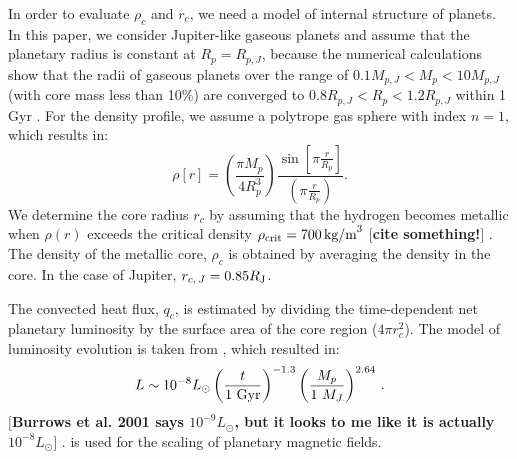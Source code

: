 \documentclass{emulateapj}
\def\memoYF#1{\color{red}$[${\bf #1}$]$ \color{black}}
\begin{document}
In order to evaluate $\rho _c $ and $r_c$, we need a model of internal structure of planets. 
In this paper, we consider Jupiter-like gaseous planets and assume that the planetary radius is constant at $R_p = R_{p,J}$, because the numerical calculations show that the radii of gaseous planets over the range of $0.1 M_{p, J} < M_p < 10M_{p, J}$ (with core mass less than 10\%) are converged to $0.8 R_{p, J} < R_p < 1.2R_{p, J}$ within 1 Gyr \citep{fortney2007}. 
For the density profile, we assume a polytrope gas sphere with index $n=1$, which results in:
\begin{equation}
\rho [r] = \left( \frac{\pi M_p}{4 R_p^3} \right) \frac{\sin \left[ \pi \frac{r}{R_p} \right]}{\left( \pi \frac{r}{R_p} \right)}. \label{eq:rho_r}
\end{equation}
We determine the core radius $r_c$ by assuming that the hydrogen becomes metallic when $\rho (r)$ exceeds the critical density $\rho_{\rm crit}=700\,\mbox{kg/m}^3$ \memoYF{cite something!}. The density of the metallic core, $\rho _c$ is obtained by averaging the density in the core. 
In the case of Jupiter, $r_{c,\,J} = 0.85 R_{\rm J}$. 

The convected heat flux, $q_c$, is estimated by dividing the time-dependent net planetary luminosity by the surface area of the core region ($4\pi r_c^2$). 
The model of luminosity evolution is taken from \citet{burrows_et_al2001} \citep[see also][]{marley2007}, which resulted in:
\begin{equation}
L \sim {10^{-8} L_\odot} \left( \frac{t}{1 \rm~Gyr} \right)^{-1.3} \left( \frac{M_p}{1~M_J} \right)^{2.64} \, .
\label{eq:burrowsLum}
\end{equation}
\memoYF{Burrows et al. 2001 says $10^{-9} L_\odot $, but it looks to me like it is actually $10^{-8} L_\odot $}. 
is used for the scaling of planetary magnetic fields. 
\end{document}
